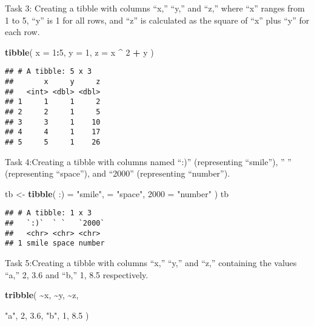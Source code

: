 \documentclass[
]{article}
\newenvironment{Shaded}{\begin{snugshade}}{\end{snugshade}}
\newcommand{\AttributeTok}[1]{\textcolor[rgb]{0.13,0.29,0.53}{#1}}
\newcommand{\DecValTok}[1]{\textcolor[rgb]{0.00,0.00,0.81}{#1}}
\newcommand{\FloatTok}[1]{\textcolor[rgb]{0.00,0.00,0.81}{#1}}
\newcommand{\FunctionTok}[1]{\textcolor[rgb]{0.13,0.29,0.53}{\textbf{#1}}}
\newcommand{\NormalTok}[1]{#1}
\newcommand{\OtherTok}[1]{\textcolor[rgb]{0.56,0.35,0.01}{#1}}
\newcommand{\SpecialCharTok}[1]{\textcolor[rgb]{0.81,0.36,0.00}{\textbf{#1}}}
\newcommand{\StringTok}[1]{\textcolor[rgb]{0.31,0.60,0.02}{#1}}
\begin{document}
Task 3: Creating a tibble with columns ``x,'' ``y,'' and ``z,'' where
``x'' ranges from 1 to 5, ``y'' is 1 for all rows, and ``z'' is
calculated as the square of ``x'' plus ``y'' for each row.

\begin{Shaded}
\begin{Highlighting}[]
\FunctionTok{tibble}\NormalTok{(}
  \AttributeTok{x =} \DecValTok{1}\SpecialCharTok{:}\DecValTok{5}\NormalTok{, }
  \AttributeTok{y =} \DecValTok{1}\NormalTok{, }
  \AttributeTok{z =}\NormalTok{ x }\SpecialCharTok{\^{}} \DecValTok{2} \SpecialCharTok{+}\NormalTok{ y}
\NormalTok{)}
\end{Highlighting}
\end{Shaded}

\begin{verbatim}
## # A tibble: 5 x 3
##       x     y     z
##   <int> <dbl> <dbl>
## 1     1     1     2
## 2     2     1     5
## 3     3     1    10
## 4     4     1    17
## 5     5     1    26
\end{verbatim}

Task 4:Creating a tibble with columns named ``:)'' (representing
``smile''), '' '' (representing ``space''), and ``2000'' (representing
``number'').

\begin{Shaded}
\begin{Highlighting}[]
\NormalTok{tb }\OtherTok{\textless{}{-}} \FunctionTok{tibble}\NormalTok{(}
  \StringTok{\textasciigrave{}}\AttributeTok{:)}\StringTok{\textasciigrave{}} \OtherTok{=} \StringTok{"smile"}\NormalTok{, }
  \StringTok{\textasciigrave{}}\AttributeTok{ }\StringTok{\textasciigrave{}} \OtherTok{=} \StringTok{"space"}\NormalTok{,}
  \StringTok{\textasciigrave{}}\AttributeTok{2000}\StringTok{\textasciigrave{}} \OtherTok{=} \StringTok{"number"}
\NormalTok{)}
\NormalTok{tb}
\end{Highlighting}
\end{Shaded}

\begin{verbatim}
## # A tibble: 1 x 3
##   `:)`  ` `   `2000`
##   <chr> <chr> <chr> 
## 1 smile space number
\end{verbatim}

Task 5:Creating a tibble with columns ``x,'' ``y,'' and ``z,''
containing the values ``a,'' 2, 3.6 and ``b,'' 1, 8.5 respectively.

\begin{Shaded}
\begin{Highlighting}[]
\FunctionTok{tribble}\NormalTok{(}
  \SpecialCharTok{\textasciitilde{}}\NormalTok{x, }\SpecialCharTok{\textasciitilde{}}\NormalTok{y, }\SpecialCharTok{\textasciitilde{}}\NormalTok{z,}
  
  \StringTok{"a"}\NormalTok{, }\DecValTok{2}\NormalTok{, }\FloatTok{3.6}\NormalTok{,}
  \StringTok{"b"}\NormalTok{, }\DecValTok{1}\NormalTok{, }\FloatTok{8.5}
\NormalTok{)}
\end{Highlighting}
\end{Shaded}
\end{document}

